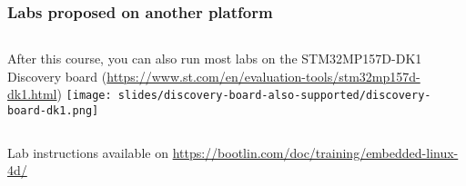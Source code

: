 \begin{frame}
\frametitle{Labs proposed on another platform}
  \begin{columns}
    After this course, you can also run most labs on the STM32MP157D-DK1 Discovery board
    (\url{https://www.st.com/en/evaluation-tools/stm32mp157d-dk1.html})
    \texttt{[image: slides/discovery-board-also-supported/discovery-board-dk1.png]}
  \end{columns}
  \vspace{1cm}
  Lab instructions available on
  \url{https://bootlin.com/doc/training/embedded-linux-4d/}
\end{frame}
